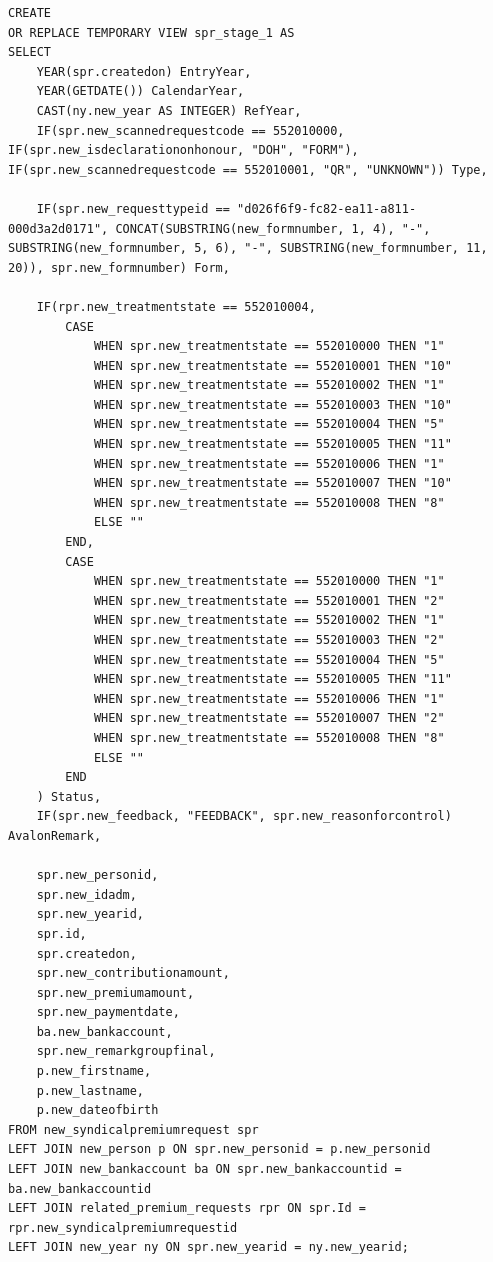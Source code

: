 \begin{verbatim}
CREATE
OR REPLACE TEMPORARY VIEW spr_stage_1 AS
SELECT 
    YEAR(spr.createdon) EntryYear, 
    YEAR(GETDATE()) CalendarYear, 
    CAST(ny.new_year AS INTEGER) RefYear, 
    IF(spr.new_scannedrequestcode == 552010000, IF(spr.new_isdeclarationonhonour, "DOH", "FORM"), IF(spr.new_scannedrequestcode == 552010001, "QR", "UNKNOWN")) Type,
    
    IF(spr.new_requesttypeid == "d026f6f9-fc82-ea11-a811-000d3a2d0171", CONCAT(SUBSTRING(new_formnumber, 1, 4), "-", SUBSTRING(new_formnumber, 5, 6), "-", SUBSTRING(new_formnumber, 11, 20)), spr.new_formnumber) Form,
    
    IF(rpr.new_treatmentstate == 552010004,
        CASE
            WHEN spr.new_treatmentstate == 552010000 THEN "1"
            WHEN spr.new_treatmentstate == 552010001 THEN "10"
            WHEN spr.new_treatmentstate == 552010002 THEN "1"
            WHEN spr.new_treatmentstate == 552010003 THEN "10"
            WHEN spr.new_treatmentstate == 552010004 THEN "5"
            WHEN spr.new_treatmentstate == 552010005 THEN "11"
            WHEN spr.new_treatmentstate == 552010006 THEN "1"
            WHEN spr.new_treatmentstate == 552010007 THEN "10"
            WHEN spr.new_treatmentstate == 552010008 THEN "8"
            ELSE ""
        END,
        CASE
            WHEN spr.new_treatmentstate == 552010000 THEN "1"
            WHEN spr.new_treatmentstate == 552010001 THEN "2"
            WHEN spr.new_treatmentstate == 552010002 THEN "1"
            WHEN spr.new_treatmentstate == 552010003 THEN "2"
            WHEN spr.new_treatmentstate == 552010004 THEN "5"
            WHEN spr.new_treatmentstate == 552010005 THEN "11"
            WHEN spr.new_treatmentstate == 552010006 THEN "1"
            WHEN spr.new_treatmentstate == 552010007 THEN "2"
            WHEN spr.new_treatmentstate == 552010008 THEN "8"
            ELSE ""
        END
    ) Status,
    IF(spr.new_feedback, "FEEDBACK", spr.new_reasonforcontrol) AvalonRemark,
    
    spr.new_personid,
    spr.new_idadm,
    spr.new_yearid,
    spr.id,
    spr.createdon,
    spr.new_contributionamount,
    spr.new_premiumamount,
    spr.new_paymentdate,
    ba.new_bankaccount,
    spr.new_remarkgroupfinal,
    p.new_firstname,
    p.new_lastname,
    p.new_dateofbirth
FROM new_syndicalpremiumrequest spr
LEFT JOIN new_person p ON spr.new_personid = p.new_personid
LEFT JOIN new_bankaccount ba ON spr.new_bankaccountid = ba.new_bankaccountid
LEFT JOIN related_premium_requests rpr ON spr.Id = rpr.new_syndicalpremiumrequestid
LEFT JOIN new_year ny ON spr.new_yearid = ny.new_yearid;
\end{verbatim}

